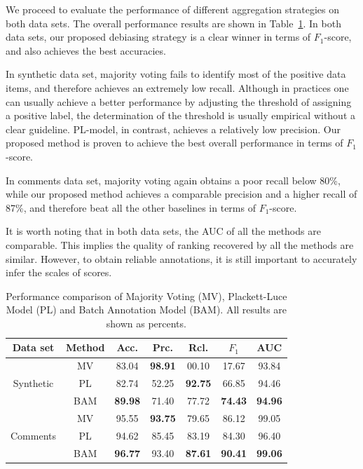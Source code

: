We proceed to evaluate the performance of different aggregation strategies on both data sets.  
The overall performance results are shown in Table~\ref{tab:performance}.  
In both data sets, our proposed debiasing strategy is a clear winner in terms of $F_1$-score, 
and also achieves the best accuracies.  

In synthetic data set, majority voting fails to identify most of the positive data items, 
and therefore achieves an extremely low recall.  
Although in practices one can usually achieve a better performance by adjusting the threshold of assigning a positive label, 
the determination of the threshold is usually empirical without a clear guideline.  
PL-model, in contrast, achieves a relatively low precision.  
Our proposed method is proven to achieve the best overall performance in terms of $F_1$-score.  

In comments data set, majority voting again obtains a poor recall below 80\%, 
while our proposed method achieves a comparable precision and a higher recall of 87\%, 
and therefore beat all the other baselines in terms of $F_1$-score.  


It is worth noting that in both data sets, the AUC of all the methods are comparable.  
This implies the quality of ranking recovered by all the methods are similar.  
However, to obtain reliable annotations, it is still important to accurately infer the scales of scores.  



\begin{table}[!t]
\centering
 {\caption{Performance comparison of Majority Voting (MV), Plackett-Luce Model (PL) and Batch Annotation Model (BAM).  
 All results are shown as percents.}\label{tab:performance}}
{
  \begin{tabular}{@{}c@{}|@{}c@{}||c|c|c|c|c@{}}
    \hline
        Data set & Method    & Acc.           & Prc.           & Rcl.           & $F_1$          & AUC \\ \hline \hline
        \multirow{3}{*}{Synthetic}
                 & MV        & 83.04          & \textbf{98.91} & 00.10          & 17.67          & 93.84          \\ \cline{2-7}
                 & PL        & 82.74          & 52.25          & \textbf{92.75} & 66.85          & 94.46          \\ \cline{2-7}
                 & BAM       & \textbf{89.98} & 71.40          & 77.72          & \textbf{74.43} & \textbf{94.96} \\ \hline
        \multirow{3}{*}{Comments}
                 & MV        & 95.55          & \textbf{93.75} & 79.65          & 86.12          & 99.05          \\ \cline{2-7}
                 & PL        & 94.62          & 85.45          & 83.19          & 84.30          & 96.40          \\ \cline{2-7}
                 & BAM       & \textbf{96.77} & 93.40          & \textbf{87.61} & \textbf{90.41} & \textbf{99.06} \\ \hline
  \end{tabular}
}
\end{table}
